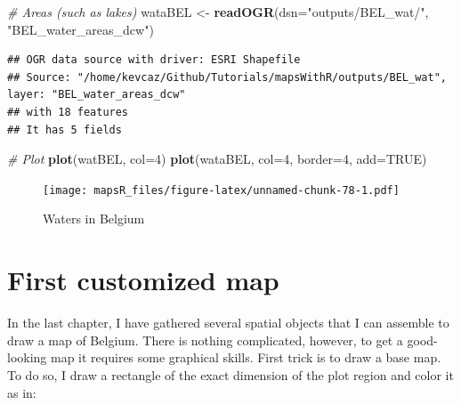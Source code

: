 \documentclass[]{report}
\newenvironment{Shaded}{\begin{snugshade}}{\end{snugshade}}
\newcommand{\CommentTok}[1]{\textcolor[rgb]{0.56,0.35,0.01}{\textit{#1}}}
\newcommand{\DataTypeTok}[1]{\textcolor[rgb]{0.13,0.29,0.53}{#1}}
\newcommand{\DecValTok}[1]{\textcolor[rgb]{0.00,0.00,0.81}{#1}}
\newcommand{\KeywordTok}[1]{\textcolor[rgb]{0.13,0.29,0.53}{\textbf{#1}}}
\newcommand{\NormalTok}[1]{#1}
\newcommand{\OtherTok}[1]{\textcolor[rgb]{0.56,0.35,0.01}{#1}}
\newcommand{\StringTok}[1]{\textcolor[rgb]{0.31,0.60,0.02}{#1}}
\begin{document}
\begin{Shaded}
\begin{Highlighting}[]
\CommentTok{# Areas (such as lakes)}
\NormalTok{wataBEL <-}\StringTok{ }\KeywordTok{readOGR}\NormalTok{(}\DataTypeTok{dsn=}\StringTok{"outputs/BEL_wat/"}\NormalTok{, }\StringTok{"BEL_water_areas_dcw"}\NormalTok{)}
\end{Highlighting}
\end{Shaded}

\begin{verbatim}
## OGR data source with driver: ESRI Shapefile 
## Source: "/home/kevcaz/Github/Tutorials/mapsWithR/outputs/BEL_wat", layer: "BEL_water_areas_dcw"
## with 18 features
## It has 5 fields
\end{verbatim}

\begin{Shaded}
\begin{Highlighting}[]
\CommentTok{# Plot}
\KeywordTok{plot}\NormalTok{(watBEL, }\DataTypeTok{col=}\DecValTok{4}\NormalTok{)}
\KeywordTok{plot}\NormalTok{(wataBEL, }\DataTypeTok{col=}\DecValTok{4}\NormalTok{, }\DataTypeTok{border=}\DecValTok{4}\NormalTok{, }\DataTypeTok{add=}\OtherTok{TRUE}\NormalTok{)}
\end{Highlighting}
\end{Shaded}

\begin{figure}
\centering
\texttt{[image: mapsR\_files/figure-latex/unnamed-chunk-78-1.pdf]}
\caption{Waters in Belgium}
\end{figure}

\hypertarget{first-customized-map}{%
\chapter{First customized map}\label{first-customized-map}}

In the last chapter, I have gathered several spatial objects that I can
assemble to draw a map of Belgium. There is nothing complicated,
however, to get a good-looking map it requires some graphical skills.
First trick is to draw a base map. To do so, I draw a rectangle of the
exact dimension of the plot region and color it as in:
\end{document}
